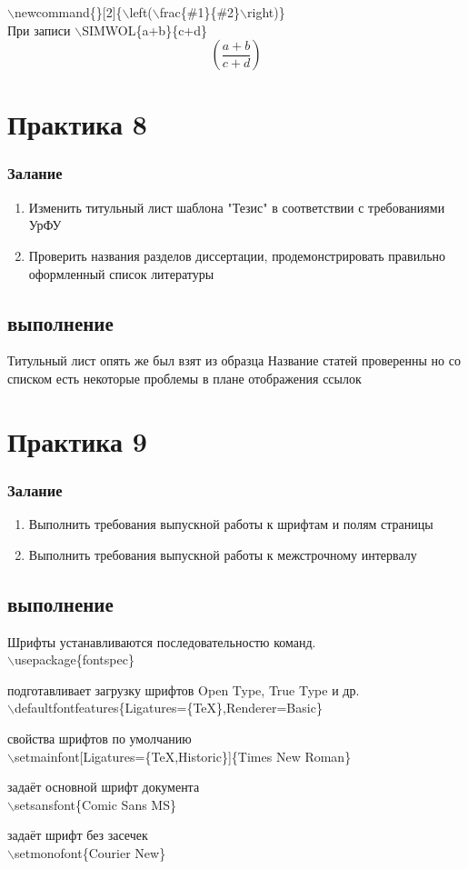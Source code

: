 \documentclass[a4paper,14pt,oneside]{book}
\theoremstyle{plain} %
\theoremstyle{definition} %
\theoremstyle{remark} %
\begin{document}
$\backslash$newcommand\{\SIMWOL\}[2]\{$\backslash$left($\backslash$frac\{\#1\}\{\#2\}$\backslash$right)\}
\newcommand{\SIMWOL}[2]{\left(\frac{#1}{#2}\right)}\\
При записи $\backslash$SIMWOL\{a+b\}\{c+d\}
\[\SIMWOL{a+b}{c+d}
\]

\chapter{Практика 8}
\subsection{Залание}
\begin{enumerate}
\item Изменить титульный лист шаблона "Тезис" в соответствии с требованиями УрФУ 
\item Проверить названия разделов диссертации, продемонстрировать правильно оформленный список литературы 
\end{enumerate}
\section{выполнение}
Титульный лист опять же был взят из образца \cite{UrFU}
Название статей проверенны но со списком есть некоторые проблемы в плане отображения ссылок
\chapter{Практика 9}
\subsection{Залание}
\begin{enumerate}
\item Выполнить требования выпускной работы к шрифтам и полям страницы 
\item Выполнить требования выпускной работы к межстрочному интервалу 
\end{enumerate}
\section{выполнение}
Шрифты устанавливаются последовательностю команд. \\
$\backslash$usepackage\{fontspec\} 
\par \hfill {\ttfamily подготавливает загрузку шрифтов Open Type, True Type и др.}\\
$\backslash$defaultfontfeatures\{Ligatures=\{TeX\},Renderer=Basic\}
\par \hfill  {\ttfamily свойства шрифтов по умолчанию}\\
$\backslash$setmainfont[Ligatures=\{TeX,Historic\}]\{Times New Roman\} \par \hfill {\ttfamily задаёт основной шрифт документа}\\
$\backslash$setsansfont\{Comic Sans MS\}                  \par\hfill {\ttfamily задаёт шрифт без засечек}\\
$\backslash$setmonofont\{Courier New\}
\end{document}
